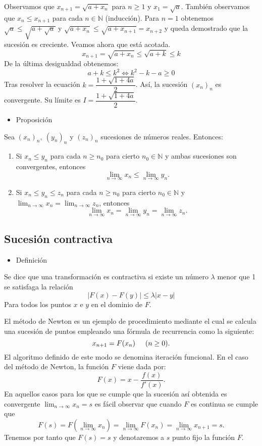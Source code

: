 \documentclass[12pt]{article}
\begin{document}
Observamos que $x_{n+1}=\sqrt{a+x_n}$ para $n\ge1$ y $x_1=\sqrt{a}$. También observamos que $x_n\le x_{n+1}$ para cada $n\in\mathbb{N}$ (inducción). Para $n=1$ obtenemos $\sqrt{a}\le\sqrt{a+\sqrt{a}}$ y $\sqrt{a+x_n}\le \sqrt{a+x_{n+1}}=x_{n+2}$ y queda demostrado que la sucesión es creciente. Veamos ahora que está acotada. \[ x_{n+1}=\sqrt{a+x_n}\le\sqrt{a+k}\le k \] De la última desigualdad obtenemos: \[ a+k\le k^2\Longleftrightarrow k^2-k-a\ge0\]
Tras resolver la ecuación $k=\dfrac{1+\sqrt{1+4a}}{2}$. Así, la sucesión $(x_n)_n$ es convergente. Su límite es $I=\dfrac{1+\sqrt{1+4a}}{2}$.
\begin{itemize}[label=\color{red}\textbullet, leftmargin=*]
	\item \color{lightblue}Proposición
\end{itemize}
Sea $(x_n)_n,~(y_n)_n$ y $(z_n)_n$ sucesiones de números reales. Entonces:
\begin{enumerate}[label=\arabic*)]
	\item Si $x_n\le y_n$ para cada $n\ge n_0$ para cierto $n_0\in\mathbb{N}$ y ambas sucesiones son convergentes, entonces \[ \lim_{n\to\infty}x_n\le\lim_{n\to\infty}y_n. \]
	\item Si $x_n\le y_n\le z_n$ para cada $n\ge n_0$ para cierto $n_0\in\mathbb{N}$ y $\lim_{n\to\infty}x_n=\lim_{n\to\infty}z_n$, entonces \[ \lim_{n\to\infty}x_n=\lim_{n\to\infty}y_n=\lim_{n\to\infty}z_n. \]
\end{enumerate}
\subsection{Sucesión contractiva}
\begin{itemize}[label=\color{red}\textbullet, leftmargin=*]
	\item \color{lightblue}Definición
\end{itemize}
Se dice que una transformación es contractiva si existe un número $\lambda$ menor que 1 se satisfaga la relación \[ |F(x)-F(y)|\le\lambda|x-y| \]
Para todos los puntos $x$ e $y$ en el dominio de $F$.

El método de Newton es un ejemplo de procedimiento mediante el cual se calcula una sucesión de puntos empleando una fórmula de recurrencia como la siguiente: \[ x_{n+1}=F(x_n)\hspace{0.5cm}(n\ge0) .\]
El algoritmo definido de este modo se denomina iteración funcional. En el caso del método de Newton, la función $F$ viene dada por: \[ F(x)=x-\dfrac{f(x)}{f'(x)}. \]
En aquellos casos para los que se cumple que la sucesión así obtenida es convergente $\lim_{n\to\infty}x_n=s$ es fácil observar que cuando $F$ es continua se cumple que \[ F(s)=F\left(\lim_{n\to\infty}x_n\right)=\lim_{n\to\infty}F(x_n)=\lim_{n\to\infty}x_{n+1}=s. \]
Tenemos por tanto que $F(s)=s$ y denotaremos a $s$ punto fijo la función $F$.
\end{document}
